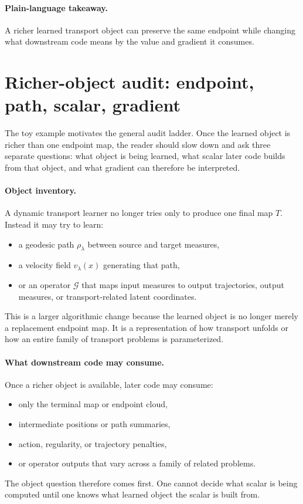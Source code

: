 \paragraph{Plain-language takeaway.}
A richer learned transport object can preserve the same endpoint while changing
what downstream code means by the value and gradient it consumes.

\section{Richer-object audit: endpoint, path, scalar, gradient}
\label{sec:bf-neural-ot-dynamic-object}

The toy example motivates the general audit ladder.  Once the learned object is
richer than one endpoint map, the reader should slow down and ask three separate
questions: what object is being learned, what scalar later code builds from that
object, and what gradient can therefore be interpreted.

\paragraph{Object inventory.}
A dynamic transport learner no longer tries only to produce one final map
\(T\).  Instead it may try to learn:
\begin{itemize}
  \item a geodesic path \(\rho_\lambda\) between source and target measures,
  \item a velocity field \(v_\lambda(x)\) generating that path,
  \item or an operator \(\mathcal G\) that maps input measures to output
  trajectories, output measures, or transport-related latent coordinates.
\end{itemize}
This is a larger algorithmic change because the learned object is no longer merely
a replacement endpoint map.  It is a representation of how transport unfolds or
how an entire family of transport problems is parameterized.

\paragraph{What downstream code may consume.}
Once a richer object is available, later code may consume:
\begin{itemize}
  \item only the terminal map or endpoint cloud,
  \item intermediate positions or path summaries,
  \item action, regularity, or trajectory penalties,
  \item or operator outputs that vary across a family of related problems.
\end{itemize}
The object question therefore comes first.  One cannot decide what scalar is being
computed until one knows what learned object the scalar is built from.

